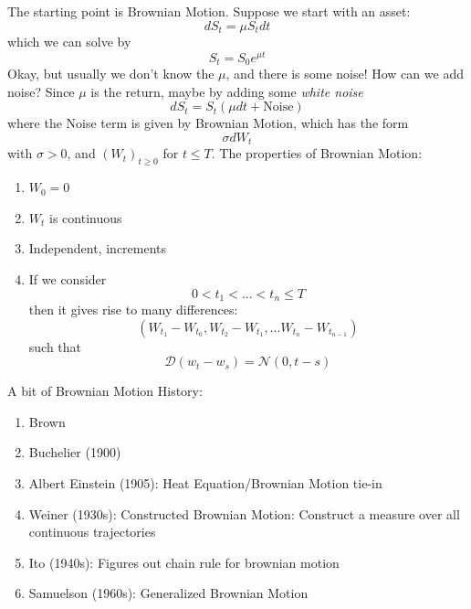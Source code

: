 \documentclass[twocolumn,openany]{book}
\begin{document}
The starting point is Brownian Motion. Suppose we start with an asset:
\begin{equation}
	dS_t = \mu S_t dt
\end{equation}
which we can solve by
\begin{equation}
	S_t = S_0e^{\mu t}
\end{equation}
Okay, but usually we don't know the $\mu$, and there is some noise! How can we add noise? Since $\mu$ is the return, maybe by adding some \emph{white noise}
\begin{equation}
	dS_t = S_t(\mu dt + \text{Noise})
\end{equation}
where the Noise term is given by Brownian Motion, which has the form
\begin{equation}
	\sigma dW_t
\end{equation}
with $\sigma > 0$, and $(W_t)_{t\geq 0}$ for $t\leq T$. The properties of Brownian Motion:
\begin{enumerate}
	\item $W_0=0$
	\item $W_t$ is continuous
	\item Independent, increments
	\item If we consider
	\begin{equation}
		0 < t_1 < ... < t_n \leq T
	\end{equation}
	then it gives rise to many differences:
	\begin{equation}
		(W_{t_1} - W_{t_0}, W_{t_2} - W_{t_1}, ... W_{t_n} - W_{t_{n-1}})
	\end{equation}
	such that
	\begin{equation}
		\mathcal{D}(w_t - w_s) = \mathcal{N}(0, t-s)
	\end{equation}
\end{enumerate}
A bit of Brownian Motion History:
\begin{enumerate}
	\item Brown
	\item Buchelier (1900)
	\item Albert Einstein (1905): Heat Equation/Brownian Motion tie-in
	\item Weiner (1930s): Constructed Brownian Motion: Construct a measure over all continuous trajectories
	\item Ito (1940s): Figures out chain rule for brownian motion
	\item Samuelson (1960s): Generalized Brownian Motion
\end{enumerate}
\end{document}

